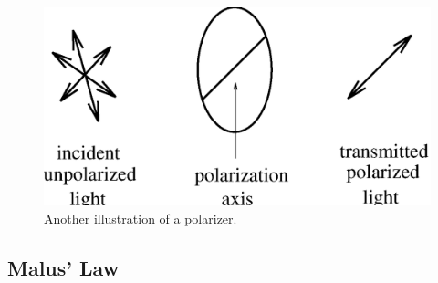 \begin{figure}
\centering 
\epsfxsize=8cm \includegraphics[scale=0.6]{7_polarization/transmit.eps}
\caption{Another illustration of a polarizer.}
\label{fig:pol:transmit}
\end{figure}

\subsection{Malus' Law}

